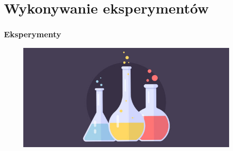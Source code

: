 \section{Wykonywanie eksperymentów}
\label{podzial_zadan}

\begin{frame}
    \frametitle{Eksperymenty}
    
    \begin{figure}[H]
    \includegraphics[scale=0.5]{img/exp1.jpg} 
    \end{figure}
    
\end{frame}

